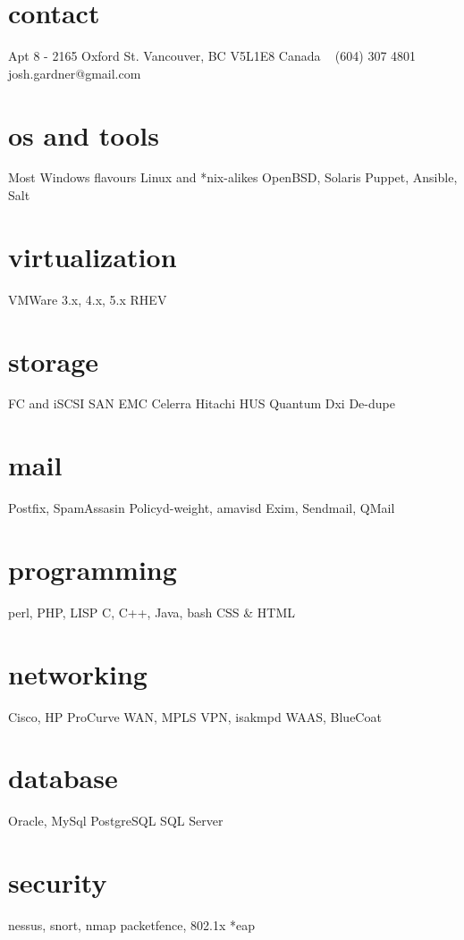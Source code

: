 \documentclass[]{friggeri-cv} %
\begin{document}


\begin{aside} %
\section{contact}
Apt 8 - 2165 Oxford St.
Vancouver, BC V5L1E8
Canada
~
(604) 307 4801
~
josh.gardner@gmail.com
\section{os and tools}
Most Windows flavours
Linux and *nix-alikes
OpenBSD, Solaris
Puppet, Ansible, Salt
\section{virtualization}
VMWare 3.x, 4.x, 5.x
RHEV
\section{storage}
FC and iSCSI SAN
EMC Celerra
Hitachi HUS
Quantum Dxi
De-dupe
\section{mail}
Postfix, SpamAssasin
Policyd-weight, amavisd
Exim, Sendmail, QMail
\section{programming}
perl, PHP, LISP
C, C++, Java, bash
CSS \& HTML
\section{networking}
Cisco, HP ProCurve
WAN, MPLS
VPN, isakmpd
WAAS, BlueCoat
\section{database}
Oracle, MySql
PostgreSQL
SQL Server
\section{security}
nessus, snort, nmap
packetfence, 802.1x
*eap
\end{aside}
\end{document}
